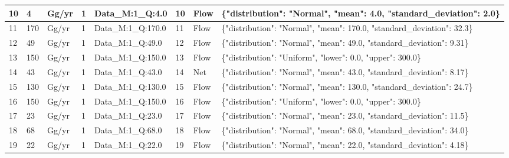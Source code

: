 \documentclass[ %
                    author={Tom Jager},
                supervisor={Dr. Daniel Schien},
                    degree={MEng},
                     title={A Bayesian Inference Engine for Calibrating Uncertainty over UMIS Structured MFA Systems},
                  subtitle={},
                      type={research},
                      year={2019} ]{dissertation}
\begin{document}
\begin{table}[]
\begin{tabular}{|l|l|l|l|l|l|p{1.1cm}|p{5cm}|}
10                & 4                 & Gg/yr         & 1                     & Data\_M:1\_Q:4.0   & 10                & Flow                 & \{"distribution": "Normal", "mean": 4.0, "standard\_deviation": 2.0\}    \\ \hline
11                & 170               & Gg/yr         & 1                     & Data\_M:1\_Q:170.0 & 11                & Flow                 & \{"distribution": "Normal", "mean": 170.0, "standard\_deviation": 32.3\} \\ \hline
12                & 49                & Gg/yr         & 1                     & Data\_M:1\_Q:49.0  & 12                & Flow                 & \{"distribution": "Normal", "mean": 49.0, "standard\_deviation": 9.31\}  \\ \hline
13                & 150               & Gg/yr         & 1                     & Data\_M:1\_Q:150.0 & 13                & Flow                 & \{"distribution": "Uniform", "lower": 0.0, "upper": 300.0\}              \\ \hline
14                & 43                & Gg/yr         & 1                     & Data\_M:1\_Q:43.0  & 14                & Net                  & \{"distribution": "Normal", "mean": 43.0, "standard\_deviation": 8.17\}  \\ \hline
15                & 130               & Gg/yr         & 1                     & Data\_M:1\_Q:130.0 & 15                & Flow                 & \{"distribution": "Normal", "mean": 130.0, "standard\_deviation": 24.7\} \\ \hline
16                & 150               & Gg/yr         & 1                     & Data\_M:1\_Q:150.0 & 16                & Flow                 & \{"distribution": "Uniform", "lower": 0.0, "upper": 300.0\}              \\ \hline
17                & 23                & Gg/yr         & 1                     & Data\_M:1\_Q:23.0  & 17                & Flow                 & \{"distribution": "Normal", "mean": 23.0, "standard\_deviation": 11.5\}  \\ \hline
18                & 68                & Gg/yr         & 1                     & Data\_M:1\_Q:68.0  & 18                & Flow                 & \{"distribution": "Normal", "mean": 68.0, "standard\_deviation": 34.0\}  \\ \hline
19                & 22                & Gg/yr         & 1                     & Data\_M:1\_Q:22.0  & 19                & Flow                 & \{"distribution": "Normal", "mean": 22.0, "standard\_deviation": 4.18\}  \\ \hline

\end{tabular}
\end{table}
\end{document}
